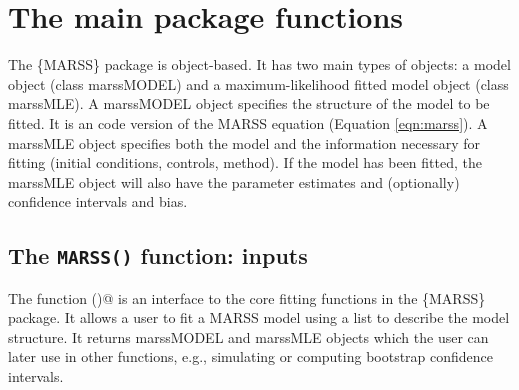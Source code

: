 \chapter{The main package functions}
\label{chap:mainfunctions}
The \{MARSS\} package is object-based.  It has two main types of objects: a model object (class marssMODEL) and a maximum-likelihood fitted model object (class marssMLE). A marssMODEL object specifies the structure of the model to be fitted.  It is an \R code version of the MARSS equation (Equation \ref{eqn:marss}).  A marssMLE object specifies both the model and the information necessary for fitting (initial conditions, controls, method).  If the model has been fitted, the marssMLE object will also have the parameter estimates and (optionally) confidence intervals and bias.  

\section{The \texttt{MARSS()} function: inputs}
The function \verb@MARSS()@ is an interface to the core fitting functions in the \{MARSS\} package.  It allows a user to fit a MARSS model using a list to describe the model structure.  It returns marssMODEL and marssMLE objects which the user can later use in other functions, e.g., simulating or computing bootstrap confidence intervals.

